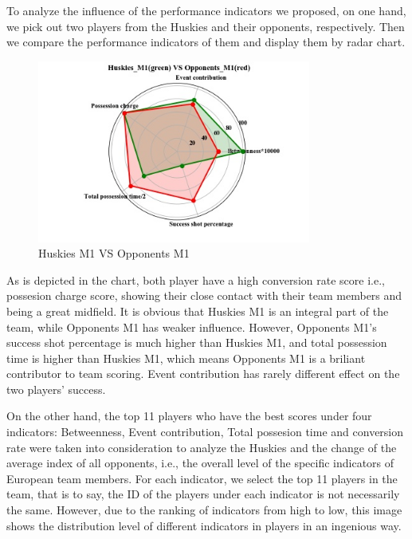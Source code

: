 \documentclass{mcmthesis}
\begin{document}
{To analyze the influence of the performance indicators we proposed, on one hand, we pick out two players from the Huskies and their opponents, respectively. Then we compare the performance indicators of them and display them by radar chart.

\begin{figure}[h]
\small
\centering
\includegraphics[width=9cm]{dota_radar.jpg}
\caption{Huskies M1 VS Opponents M1} \label{fig:aa}
\end{figure}

As is depicted in the chart, both player have a high conversion rate score i.e., possesion charge score, showing their close contact with their team members and being a great midfield. It is obvious that Huskies M1 is an integral part of the team, while Opponents M1 has weaker influence. However, Opponents M1's success shot percentage is much higher than Huskies M1, and total possession time is higher than Huskies M1, which means Opponents M1 is a briliant contributor to team scoring. Event contribution has rarely different effect on the two players' success. 

On the other hand, the top 11 players who have the best scores under four indicators: Betweenness, Event contribution, Total possesion time and conversion rate were taken into consideration to analyze the Huskies and the change of the average index of all opponents, i.e., the overall level of the specific indicators of European team members. For each indicator, we select the top 11 players in the team, that is to say, the ID of the players under each indicator is not necessarily the same. However, due to the ranking of indicators from high to low, this image shows the distribution level of different indicators in players in an ingenious way.


}
\end{document}
